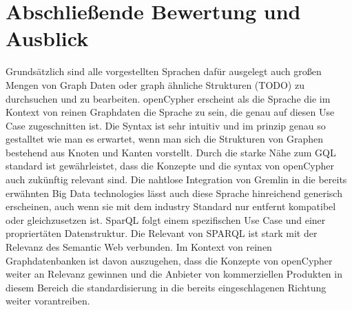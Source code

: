 \section{Abschließende Bewertung und Ausblick}
Grundsätzlich sind alle vorgestellten Sprachen dafür ausgelegt auch großen Mengen 
von Graph Daten oder graph ähnliche Strukturen (TODO) zu durchsuchen und zu bearbeiten.
openCypher erscheint als die Sprache die im Kontext von reinen Graphdaten die Sprache zu sein,
die genau auf diesen Use Case zugeschnitten ist. Die Syntax ist sehr intuitiv und im prinzip
genau so gestalltet wie man es erwartet, wenn man sich die Strukturen von Graphen bestehend 
aus Knoten und Kanten vorstellt.
Durch die starke Nähe zum GQL standard ist gewährleistet, dass die Konzepte und die 
syntax von openCypher auch zukünftig relevant sind.
Die nahtlose Integration von Gremlin in die bereits erwähnten Big Data technologies 
lässt auch diese Sprache hinreichend generisch erscheinen, auch wenn sie mit dem 
industry Standard nur entfernt kompatibel oder gleichzusetzen ist. 
SparQL folgt einem spezifischen Use Case und einer propriertäten Datenstruktur. 
Die Relevant von SPARQL ist stark mit der Relevanz des Semantic Web verbunden.
Im Kontext von reinen Graphdatenbanken ist davon auszugehen, dass die Konzepte von 
openCypher weiter an Relevanz gewinnen und die Anbieter von kommerziellen Produkten
in diesem Bereich die standardisierung in die bereits eingeschlagenen Richtung 
weiter vorantreiben.







